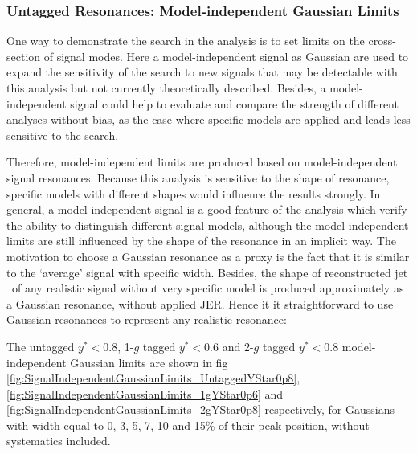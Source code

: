 \subsubsection{Untagged Resonances: Model-independent Gaussian Limits}
One way to demonstrate the search in the analysis is to set limits on the cross-section of signal modes. Here a model-independent signal as Gaussian are used to expand the sensitivity of the search to new signals that may be detectable with this analysis but not currently theoretically described. Besides, a model-independent signal could help to evaluate and compare the strength of different analyses without bias, as the case where specific models are applied and leads less sensitive to the search.

Therefore, model-independent limits are produced based on model-independent signal resonances. Because this analysis is sensitive to the shape of resonance, specific models with different shapes would influence the results strongly. In general, a model-independent signal is a good feature of the analysis which verify the ability to distinguish different signal models, although the model-independent limits are still influenced by the shape of the resonance in an implicit way. The motivation to choose a Gaussian resonance as a proxy is the fact that it is similar to the `average' signal with specific width. Besides, the shape of reconstructed jet \pt~of any realistic signal without very specific model is produced approximately as a Gaussian resonance, without applied JER. Hence it it straightforward to use Gaussian resonances to represent any realistic resonance:


The untagged $y^{*} < 0.8$, 1-$g$ tagged $y^{*} < 0.6$ and 2-$g$ tagged $y^{*} < 0.8$ model-independent Gaussian limits are shown in fig \ref{fig:SignalIndependentGaussianLimits_UntaggedYStar0p8}, \ref{fig:SignalIndependentGaussianLimits_1gYStar0p6} and \ref{fig:SignalIndependentGaussianLimits_2gYStar0p8} respectively, for Gaussians with width equal to 0, 3, 5, 7, 10 and 15\% of their peak position, without systematics included. 

